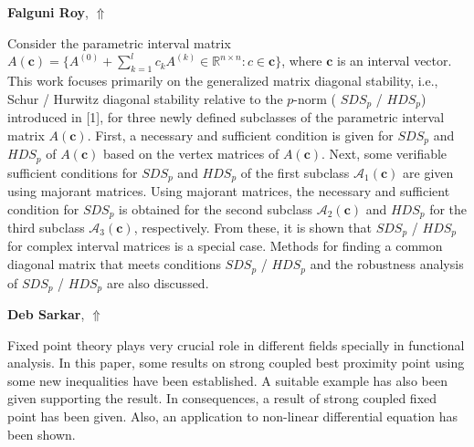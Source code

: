 \documentclass[ILAS2025-program.tex]{subfiles}
\begin{document}
\hypertarget{down0106}{}\begin{ilasabstract}
    
\textbf{Falguni Roy},  \hfill \hyperlink{up0106}{$\Uparrow$}
    
    
\mtskip
    Consider the parametric interval matrix
$A(\mathbf{c})=\Big\{A^{(0)}+\displaystyle \sum_{k=1}^{l}c_kA^{(k)}\in \mathbb{R}^{n \times n}:c\in\mathbf{c}\Big\}$, where $\mathbf{c}$ is an interval vector. This work focuses primarily on the generalized matrix diagonal stability, i.e., Schur / Hurwitz diagonal stability relative to the $p$-norm ( $SDS_p$ / $HDS_p$) introduced in [1], for three newly defined subclasses of the parametric interval matrix $A(\mathbf{c})$.
  First, a necessary and sufficient condition is given for $SDS_p$ and $HDS_p$ of $A(\mathbf{c})$ based on the vertex matrices of $A(\mathbf{c})$. Next, some verifiable sufficient conditions for $SDS_p$ and $HDS_p$  of the first subclass $\mathcal{A}_1(\mathbf{c})$ are given using majorant matrices. Using majorant matrices, the necessary and sufficient condition for $SDS_p$ is obtained for the second subclass $\mathcal{A}_2(\mathbf{c})$ and $HDS_p$ for the third subclass $\mathcal{A}_3(\mathbf{c})$, respectively. From these, it is shown that $SDS_p$ / $HDS_p$ for complex interval matrices is a special case. Methods for finding a common diagonal matrix that meets conditions $SDS_p$ / $HDS_p$ and the robustness analysis of $SDS_p$ / $HDS_p$ are also discussed.

\end{ilasabstract}
    

\hypertarget{down0421}{}\begin{ilasabstract}
    
\textbf{Deb Sarkar},  \hfill \hyperlink{up0421}{$\Uparrow$}
    
    
\mtskip
    Fixed point theory plays very crucial role in different fields specially in functional analysis. In this paper, some results on strong coupled best proximity point using some new inequalities have been established. A suitable example has also been given supporting the result. In consequences, a result of strong coupled fixed point has been given. Also, an application to non-linear differential equation has been shown. 
\end{ilasabstract}
    
\end{document}
